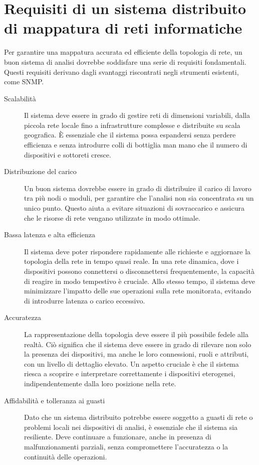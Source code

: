 \documentclass[target=bach,aauheader=,style=]{thud}
\begin{document}
\chapter{Requisiti di un sistema distribuito di mappatura di reti informatiche}
Per garantire una mappatura accurata ed efficiente della topologia di rete, un buon sistema di analisi dovrebbe soddisfare una serie di requisiti fondamentali. Questi requisiti derivano dagli svantaggi riscontrati negli strumenti esistenti, come SNMP.

\begin{description}
  \item[Scalabilità]
  Il sistema deve essere in grado di gestire reti di dimensioni variabili, dalla piccola rete locale fino a infrastrutture complesse e distribuite su scala geografica. È essenziale che il sistema possa espandersi senza perdere efficienza e senza introdurre colli di bottiglia man mano che il numero di dispositivi e sottoreti cresce.

  \item[Distribuzione del carico]
  Un buon sistema dovrebbe essere in grado di distribuire il carico di lavoro tra più nodi o moduli, per garantire che l'analisi non sia concentrata su un unico punto. Questo aiuta a evitare situazioni di sovraccarico e assicura che le risorse di rete vengano utilizzate in modo ottimale.

  \item[Bassa latenza e alta efficienza]
  Il sistema deve poter rispondere rapidamente alle richieste e aggiornare la topologia della rete in tempo quasi reale. In una rete dinamica, dove i dispositivi possono connettersi o disconnettersi frequentemente, la capacità di reagire in modo tempestivo è cruciale. Allo stesso tempo, il sistema deve minimizzare l'impatto delle sue operazioni sulla rete monitorata, evitando di introdurre latenza o carico eccessivo.

  \item[Accuratezza]
  La rappresentazione della topologia deve essere il più possibile fedele alla realtà. Ciò significa che il sistema deve essere in grado di rilevare non solo la presenza dei dispositivi, ma anche le loro connessioni, ruoli e attributi, con un livello di dettaglio elevato. Un aspetto cruciale è che il sistema riesca a scoprire e interpretare correttamente i dispositivi eterogenei, indipendentemente dalla loro posizione nella rete.

  \item[Affidabilità e tolleranza ai guasti]
  Dato che un sistema distribuito potrebbe essere soggetto a guasti di rete o problemi locali nei dispositivi di analisi, è essenziale che il sistema sia resiliente. Deve continuare a funzionare, anche in presenza di malfunzionamenti parziali, senza compromettere l'accuratezza o la continuità delle operazioni.


\end{description}
\end{document}
